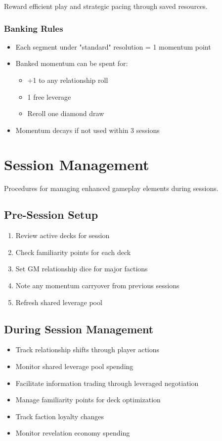 \begin{description}
Reward efficient play and strategic pacing through saved resources.

\subsubsection{Banking Rules}

\begin{itemize}
\item Each segment under "standard" resolution = 1 momentum point
\item Banked momentum can be spent for:
  \begin{itemize}
  \item +1 to any relationship roll
  \item 1 free leverage
  \item Reroll one diamond draw
  \end{itemize}
\item Momentum decays if not used within 3 sessions
\end{itemize}

\section{Session Management}

Procedures for managing enhanced gameplay elements during sessions.

\subsection{Pre-Session Setup}

\begin{enumerate}
\item Review active decks for session
\item Check familiarity points for each deck
\item Set GM relationship dice for major factions
\item Note any momentum carryover from previous sessions
\item Refresh shared leverage pool
\end{enumerate}

\subsection{During Session Management}

\begin{itemize}
\item Track relationship shifts through player actions
\item Monitor shared leverage pool spending
\item Facilitate information trading through leveraged negotiation
\item Manage familiarity points for deck optimization
\item Track faction loyalty changes
\item Monitor revelation economy spending
\end{itemize}


\end{description}
